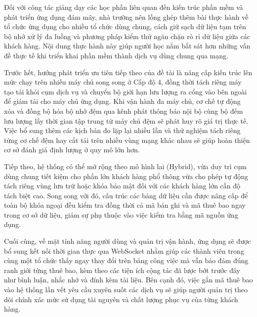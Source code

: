 Đối với công tác giảng dạy các học phần liên quan đến kiến trúc phần mềm và phát triển ứng dụng đám mây, nhà trường nên lồng ghép thêm bài thực hành về tổ chức ứng dụng cho nhiều tổ chức dùng chung, cách giữ sạch dữ liệu tạm trên bộ nhớ xử lý đa luồng và phương pháp kiểm thử ngăn chặn rò rỉ dữ liệu giữa các khách hàng. Nội dung thực hành này giúp người học nắm bắt sát hơn những vấn đề thực tế khi triển khai phần mềm thành dịch vụ dùng chung qua mạng.

\label{v4-conclusion-hướng-nghiên-cứu-tiếp-theo}

Trước hết, hướng phát triển ưu tiên tiếp theo của đề tài là nâng cấp kiến trúc lên mức chạy trên nhiều máy chủ song song ở Cấp độ 4, đồng thời tách riêng máy tạo tải khỏi cụm dịch vụ và chuyển bộ giới hạn lưu lượng ra cổng vào bên ngoài để giảm tải cho máy chủ ứng dụng. Khi vận hành đa máy chủ, cơ chế tự động xóa và đồng bộ hóa bộ nhớ đệm qua kênh phát thông báo nội bộ cùng bộ đếm lưu lượng lấy thời gian tập trung từ máy chủ đệm sẽ phát huy rõ giá trị thực tế. Việc bổ sung thêm các kịch bản đo lặp lại nhiều lần và thử nghiệm tách riêng từng cơ chế đệm hay cắt tải trên nhiều vùng mạng khác nhau sẽ giúp hoàn thiện cơ sở đánh giá định lượng ở quy mô lớn hơn.

Tiếp theo, hệ thống có thể mở rộng theo mô hình lai (Hybrid), vừa duy trì cụm dùng chung tiết kiệm cho phần lớn khách hàng phổ thông vừa cho phép tự động tách riêng vùng lưu trữ hoặc khóa bảo mật đối với các khách hàng lớn cần độ tách biệt cao. Song song với đó, cấu trúc các bảng dữ liệu cần được nâng cấp để toàn bộ khóa ngoại đều kiểm tra đồng thời cả mã bản ghi và mã thuê bao ngay trong cơ sở dữ liệu, giảm sự phụ thuộc vào việc kiểm tra bằng mã nguồn ứng dụng.

Cuối cùng, về mặt tính năng người dùng và quản trị vận hành, ứng dụng sẽ được bổ sung kết nối thời gian thực qua WebSocket nhằm giúp các thành viên trong cùng một tổ chức thấy ngay thay đổi trên bảng công việc mà vẫn bảo đảm đúng ranh giới từng thuê bao, kèm theo các tiện ích cộng tác đã lược bớt trước đây như bình luận, nhắc nhở và đính kèm tài liệu. Bên cạnh đó, việc gắn mã thuê bao vào hệ thống lần vết yêu cầu xuyên suốt các dịch vụ sẽ giúp người quản trị theo dõi chính xác mức sử dụng tài nguyên và chất lượng phục vụ của từng khách hàng.
